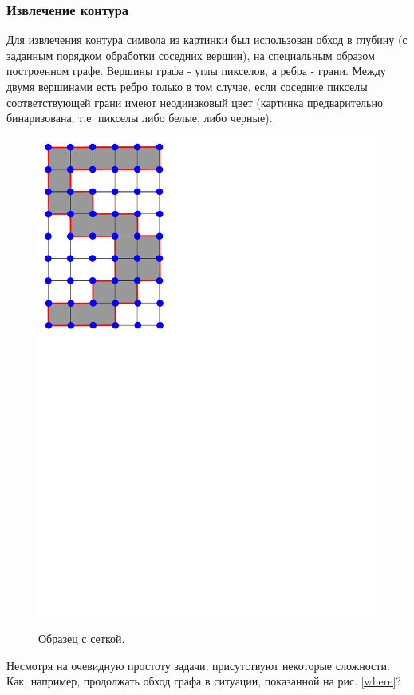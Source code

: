 \subsubsection*{Извлечение контура}
Для извлечения контура символа из картинки был использован обход в глубину (с 
заданным порядком обработки соседних вершин), 
на специальным образом построенном графе. Вершины графа - углы пикселов, а 
ребра - грани. Между двумя вершинами есть ребро только в том случае, если 
соседние пикселы соответствующей грани имеют неодинаковый цвет (картинка предварительно 
бинаризована, т.е. пикселы либо белые, либо черные).
\begin{figure}[H]
\centering
{\includegraphics[scale=0.5, trim = 0mm 170mm 130mm 0mm, clip]{imgs/five}}
\caption{Образец с сеткой.}
\end{figure}
Несмотря на очевидную простоту задачи, присутствуют некоторые сложности. 
Как, например, продолжать обход графа в ситуации, показанной на рис. \ref{where}?
